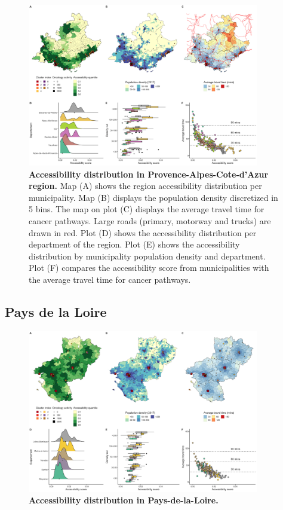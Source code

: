 \begin{figure}[H]
    \includegraphics[width=0.9\textwidth]{images/camion/fig4_accessibility_Provence-Alpes-Cote-d'Azur.png}
    \centering
    \caption{
        \textbf{Accessibility distribution in Provence-Alpes-Cote-d'Azur region.} Map (A) shows the region accessibility distribution per municipality. Map (B) displays the population density discretized in 5 bins. The map on plot (C) displays the average travel time for cancer pathways. Large roads (primary, motorway and trucks) are drawn in red. Plot (D) shows the accessibility distribution per department of the region. Plot (E) shows the accessibility distribution by municipality population density and department. Plot (F) compares the accessibility score from municipalities with the average travel time for cancer pathways.
    }
    \label{fig:accessibility-paca}
\end{figure}

\subsection*{Pays de la Loire}

\begin{figure}[H]
    \includegraphics[width=0.9\textwidth]{images/camion/region_accessibility/accessibility_Pays-de-la-Loire.png}
    \centering
    \caption{
        \textbf{Accessibility distribution in Pays-de-la-Loire.}
    }
\end{figure}

